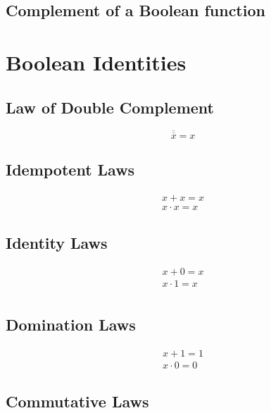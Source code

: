 \documentclass[12pt letter]{report}
\begin{document}
\subsection{Complement of a Boolean function}


\section{Boolean Identities}

\subsection{Law of Double Complement}

\[
	\overline{\overline{x}} = x
\]

\subsection{Idempotent Laws}

\begin{align*}
	x + x = x \\
	x \cdot x = x
\end{align*}

\subsection{Identity Laws}

\begin{align*}
	x + 0 = x     \\
	x \cdot 1 = x \\
\end{align*}

\subsection{Domination Laws}

\begin{align*}
	x + 1 = 1 \\
	x \cdot 0 = 0
\end{align*}

\subsection{Commutative Laws}
\end{document}
